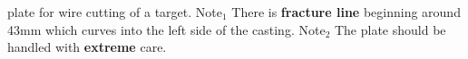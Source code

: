 \label{fig:Casting} \MgZnCa plate for wire cutting of a target. Note$_{1}$ There is \textbf{fracture line} beginning around 43mm which curves into the left side of the casting. Note$_{2}$ The plate should be handled with \textbf{extreme} care.